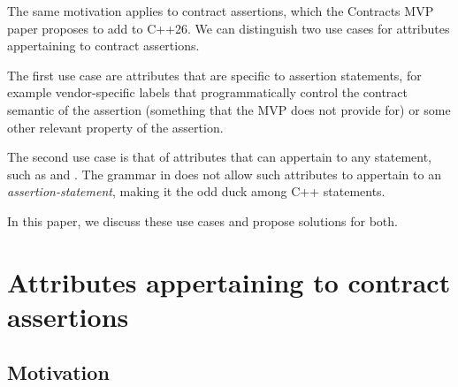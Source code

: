 The same motivation applies to contract assertions, which the Contracts MVP paper \cite{P2900R5} proposes to add to C++26. We can distinguish two use cases for attributes appertaining to contract assertions.

The first use case are attributes that are specific to assertion statements, for example vendor-specific labels that programmatically control the contract semantic of the assertion (something that the MVP does not provide for) or some other relevant property of the assertion.

The second use case is that of attributes that can appertain to any statement, such as \tcode{[[likely]]} and \tcode{[[unlikely]]}. The grammar in \cite{P2900R5} does not allow such attributes to appertain to an \emph{assertion-statement}, making it the odd duck among C++ statements.

In this paper, we discuss these use cases and propose solutions for both.


\section{Attributes appertaining to contract assertions}
\label{sec:labels}
 
 \subsection{Motivation}
 
